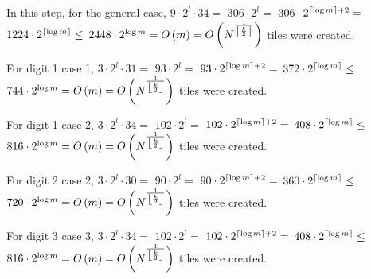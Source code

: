\begin{itemize}
    In this step, for the general case,
    $9 \cdot 2^l \cdot 34 =$
    $306 \cdot 2^l =$
    $306 \cdot 2^{\ceil*{{\log m}} + 2} =$
    $1224 \cdot 2^{\ceil*{\log m}} \leq$
    $2448 \cdot 2^{\log m} = \bigom$ tiles were created.

    For digit 1 case 1,
    $3 \cdot 2^l \cdot 31 =$
    $93 \cdot 2^l =$
    $93 \cdot 2^{\ceil*{{\log m}} + 2} =$
    $372 \cdot 2^{\ceil*{\log m}} \leq$
    $744 \cdot 2^{\log m} = \bigom$ tiles were created.

    For digit 1 case 2,
    $3 \cdot 2^l \cdot 34 =$
    $102 \cdot 2^l =$
    $102 \cdot 2^{\ceil*{{\log m}} + 2} =$
    $408 \cdot 2^{\ceil*{\log m}} \leq$
    $816 \cdot 2^{\log m} = \bigom$ tiles were created.

    For digit 2 case 2,
    $3 \cdot 2^l \cdot 30 =$
    $90 \cdot 2^l =$
    $90 \cdot 2^{\ceil*{{\log m}} + 2} =$
    $360 \cdot 2^{\ceil*{\log m}} \leq$
    $720 \cdot 2^{\log m} = \bigom$ tiles were created.

    For digit 3 case 3,
    $3 \cdot 2^l \cdot 34 =$
    $102 \cdot 2^l =$
    $102 \cdot 2^{\ceil*{{\log m}} + 2} =$
    $408 \cdot 2^{\ceil*{\log m}} \leq$
    $816 \cdot 2^{\log m} = \bigom$ tiles were created.


\end{itemize}
